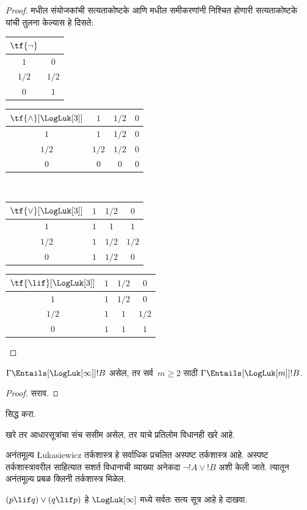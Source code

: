 \documentclass[../../../include/open-logic-section]{subfiles}
\begin{document}
\begin{proof}
   मधील संयोजकांची
  सत्यताकोष्टके आणि  मधील
  समीकरणांनी निश्चित होणारी सत्यताकोष्टके यांची तुलना
  केल्यास हे दिसते:
  \begin{center}
    \begin{tabular}{c|c}
      $\tf{\lnot}$ & \\
      \hline
      $1$ & $0$ \\
      $1/2$ & $1/2$ \\
      $0$ & $1$
    \end{tabular}
    \quad
    \begin{tabular}{c|ccc}
      $\tf{\land}[\LogLuk[3]]$ & $1$ & $1/2$ & $0$ \\
      \hline
      $1$ & $1$ & $1/2$ & $0$ \\
      $1/2$ & $1/2$ & $1/2$ & $0$\\
      $0$ & $0$ & $0$ & $0$
    \end{tabular}
    \\[2ex]
    \begin{tabular}{c|ccc}
      $\tf{\lor}[\LogLuk[3]]$ & $1$ & $1/2$ & $0$ \\
      \hline
      $1$ & $1$ & $1$ & $1$ \\
      $1/2$ & $1$ & $1/2$ & $1/2$ \\
      $0$ & $1$ & $1/2$ & $0$
    \end{tabular}
    \quad
    \begin{tabular}{c|ccc}
      $\tf{\lif}[\LogLuk[3]]$ & $1$ & $1/2$ & $0$ \\
      \hline
      $1$ & $1$ & $1/2$ & $0$ \\
      $1/2$ & $1$ & $1$ & $1/2$  \\
      $0$ & $1$ & $1$ & $1$
    \end{tabular}
  \end{center}
\end{proof}

\begin{prop}
  $\Gamma \Entails[\LogLuk[\infty]] !B$ असेल, तर
  सर्व~$m \ge 2$ साठी $\Gamma \Entails[\LogLuk[m]] !B$.
\end{prop}

\begin{proof}
  सराव.
\end{proof}

\begin{prob}
   सिद्ध करा.
\end{prob}

खरे तर आधारसूत्रांचा संच ससीम असेल, तर याचे प्रतिलोम
विधानही खरे आहे.

अनंतमूल्य \L ukasiewicz तर्कशास्त्र हे सर्वाधिक प्रचलित
अस्पष्ट तर्कशास्त्र आहे. अस्पष्ट तर्कशास्त्रावरील साहित्यात
सशर्त विधानाची व्याख्या अनेकदा $\lnot !A \lor !B$ अशी
केली जाते. त्यातून अनंतमूल्य प्रबळ क्लिनी तर्कशास्त्र मिळेल.

\begin{prob}
  $(p \lif q) \lor (q \lif p)$ हे $\LogLuk[\infty]$
  मध्ये सर्वतः सत्य सूत्र आहे हे दाखवा.
\end{prob}
\end{document}

